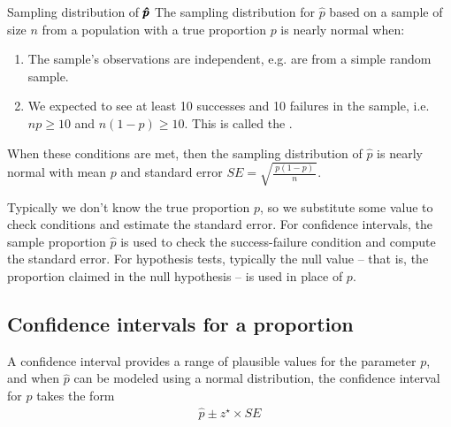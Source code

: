 \begin{onebox}{Sampling distribution of
    $\pmb{\hat{\MakeLowercase{p}}}$}
  The sampling distribution for $\hat{p}$ based on
  a sample of size $n$ from a population with a true
  proportion $p$ is nearly normal when:
  \begin{enumerate}
  \setlength{\itemsep}{0mm}
  \item The sample's observations are independent,
      e.g. are from a simple random sample.
  \item We expected to see at least 10 successes and
      10 failures in the sample, i.e. $np\geq10$ and
      $n(1-p)\geq10$.
      This is called the .
  \end{enumerate}
  When these conditions are met, then the sampling
  distribution of $\hat{p}$ is nearly normal with mean
  $p$ and standard error
  $SE = \sqrt{\frac{\ p(1-p)\ }{n}}$.
\end{onebox}

Typically we don't know the true proportion $p$,
so we substitute some value to check conditions
and estimate the standard error.
For confidence intervals, the sample proportion
$\hat{p}$ is used to check the success-failure condition
and compute the standard error.
For hypothesis tests, typically the null value --
that is, the proportion claimed in the null hypothesis --
is used in place of $p$.


\subsection{Confidence intervals for a proportion}
\label{confIntForPropSection}


A confidence interval provides a range of
plausible values for the parameter $p$,
and when $\hat{p}$ can be modeled using a
normal distribution, the confidence interval
for $p$ takes the form
\begin{align*}
\hat{p} \pm z^{\star} \times SE
\end{align*}


\newcommand{\paydayN}{826}
\newcommand{\paydayNHalf}{413}
\newcommand{\paydayRegPerc}{70\%}
\newcommand{\paydayRegProp}{0.70}
\newcommand{\paydayRegSE}{0.016}
\newcommand{\paydayRegSEPerc}{1.6\%}
\newcommand{\paydayRegLower}{0.669}
\newcommand{\paydayRegUpper}{0.731}
\newcommand{\paydayRegLowerPerc}{66.9\%}
\newcommand{\paydayRegUpperPerc}{73.1\%}

